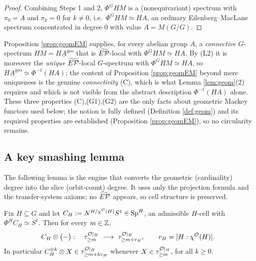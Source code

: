 \begin{proof}
Combining Steps 1 and 2, $\Phi^G HM$ is a (nonequivariant) spectrum with
$\pi_0=A$ and $\pi_k=0$ for $k\ne 0$, i.e.\ $\Phi^G HM\simeq HA$, an ordinary
Eilenberg--MacLane spectrum concentrated in degree $0$ with value $A=M(G/G)$.
\end{proof}

\begin{qfiveremark}\label{rem:geom-source}
Proposition \ref{prop:geomEM} supplies, for every abelian group $A$, a
\emph{connective} $G$-spectrum $HM=H\underline A^{\mathrm{geo}}$ that is
$\widetilde{E\mathcal P}$-local with $\Phi^G HM\simeq HA$. By (L2) it is moreover the
\emph{unique} $\widetilde{E\mathcal P}$-local $G$-spectrum with $\Phi^G HM\simeq HA$, so
$H\underline A^{\mathrm{geo}}\simeq\Phi^{-1}(HA)$; the content of Proposition
\ref{prop:geomEM} beyond mere uniqueness is the genuine \emph{connectivity}
(C), which is what Lemma \ref{lem:geom}(2) requires and which is not visible from
the abstract description $\Phi^{-1}(HA)$ alone. These three properties
(C),(G1),(G2) are the only facts about geometric Mackey functors used below; the
notion is fully defined (Definition \ref{def:geom}) and its required properties
are established (Proposition \ref{prop:geomEM}), so no circularity remains.
\end{qfiveremark}


\subsection*{A key smashing lemma}

The following lemma is the engine that converts the geometric (cardinality)
degree into the slice (orbit-count) degree. It uses only the projection formula
and the transfer-system axioms; no $\widetilde{E\mathcal P}$ appears, so cell structure is
preserved.

\begin{qfivelemma}\label{lem:shift}
Fix $H\subseteq G$ and let $C_H:=N^{H/\chi^{\mathcal{O}}(H)}S^1\in\mathrm{Sp}^H$, an admissible
$H$-cell with $\Phi^H C_H\simeq S^1$. Then for every $m\in\mathbb{Z}$,
\[
C_H\otimes\bigl(-\bigr):\quad \tau^{\mathcal{O}|_H}_{\ge m}\ \longrightarrow\
\tau^{\mathcal{O}|_H}_{\ge m+r_H},\qquad r_H=[H:\chi^{\mathcal{O}}(H)].
\]
In particular $C_H^{\otimes k}\otimes X\in\tau^{\mathcal{O}|_H}_{\ge m+kr_H}$ whenever
$X\in\tau^{\mathcal{O}|_H}_{\ge m}$, for all $k\ge 0$.
\end{qfivelemma}

